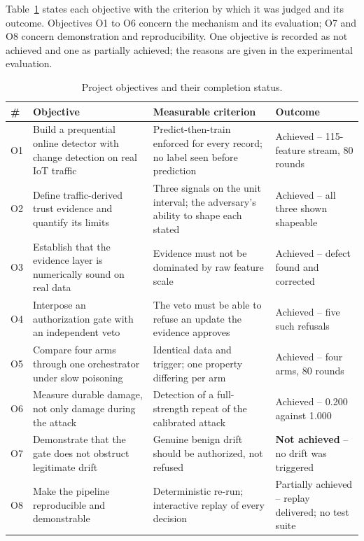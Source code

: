 \documentclass[12pt,a4paper]{report}
\begin{document}
Table~\ref{tab:obj} states each objective with the criterion by which it was
judged and its outcome. Objectives O1 to O6 concern the mechanism and its
evaluation; O7 and O8 concern demonstration and reproducibility. One objective
is recorded as not achieved and one as partially achieved; the reasons are given
in the experimental evaluation.

\begin{table}[htbp]
\centering
\caption{Project objectives and their completion status.}
\label{tab:obj}
\small
\begin{tabular}{@{}p{0.7cm}p{3.8cm}p{4.1cm}p{4.1cm}@{}}
\toprule
\textbf{\#} & \textbf{Objective} & \textbf{Measurable criterion} &
\textbf{Outcome}\\
\midrule
O1 & Build a prequential online detector with change detection on real IoT
traffic &
Predict-then-train enforced for every record; no label seen before prediction &
Achieved -- 115-feature stream, 80 rounds\\
O2 & Define traffic-derived trust evidence and quantify its limits &
Three signals on the unit interval; the adversary's ability to shape each stated
&
Achieved -- all three shown shapeable\\
O3 & Establish that the evidence layer is numerically sound on real data &
Evidence must not be dominated by raw feature scale &
Achieved -- defect found and corrected\\
O4 & Interpose an authorization gate with an independent veto &
The veto must be able to refuse an update the evidence approves &
Achieved -- five such refusals\\
O5 & Compare four arms through one orchestrator under slow poisoning &
Identical data and trigger; one property differing per arm &
Achieved -- four arms, 80 rounds\\
O6 & Measure durable damage, not only damage during the attack &
Detection of a full-strength repeat of the calibrated attack &
Achieved -- 0.200 against 1.000\\
O7 & Demonstrate that the gate does not obstruct legitimate drift &
Genuine benign drift should be authorized, not refused &
\textbf{Not achieved} -- no drift was triggered\\
O8 & Make the pipeline reproducible and demonstrable &
Deterministic re-run; interactive replay of every decision &
Partially achieved -- replay delivered; no test suite\\
\bottomrule
\end{tabular}
\end{table}
\end{document}
